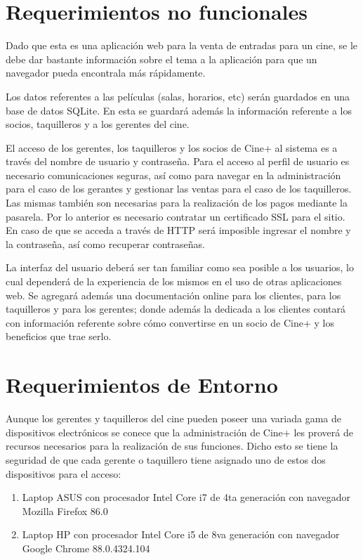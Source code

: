 \section{Requerimientos no funcionales}

Dado que esta es una aplicación web para la venta de entradas para un cine, se le debe dar bastante información sobre el tema a la aplicación para que un navegador pueda encontrala más rápidamente.

Los datos referentes a las películas (salas, horarios, etc) serán guardados en una base de datos SQLite. En esta se guardará además la información referente a los socios, taquilleros y a los gerentes del cine.

El acceso de los gerentes, los taquilleros y los socios de Cine+ al sistema es a través del nombre de usuario y contraseña. Para el acceso al perfil de usuario es necesario comunicaciones seguras, así como para navegar en la administración para el caso de los gerantes y gestionar las ventas para el caso de los taquilleros. Las mismas también son necesarias para la realización de los pagos mediante la pasarela. Por lo anterior es necesario contratar un certificado SSL para el sitio. En caso de que se acceda a través de HTTP será imposible ingresar  el nombre y la contraseña, así como recuperar contraseñas.

La interfaz del usuario deberá ser tan familiar como sea posible a los usuarios, lo cual dependerá de la experiencia de los mismos en el uso de otras aplicaciones web. Se agregará además una documentación online para los clientes, para los taquilleros y  para los gerentes; donde además la dedicada a los clientes contará con información referente sobre cómo convertirse en un socio de Cine+ y los beneficios que trae serlo.

\section{Requerimientos de Entorno}

Aunque los gerentes y taquilleros del cine pueden poseer una variada gama de dispositivos electrónicos se conece que la administración de Cine+ les proverá de recursos necesarios para la realización de sus funciones. Dicho esto se tiene la seguridad de que cada gerente o taquillero tiene asignado uno de estos dos dispositivos para el acceso:

\begin{enumerate}
    \item Laptop ASUS con procesador Intel Core i7 de 4ta generación con navegador Mozilla Firefox 86.0
    \item Laptop HP con procesador Intel Core i5 de 8va generación con navegador Google Chrome 88.0.4324.104
\end{enumerate}

